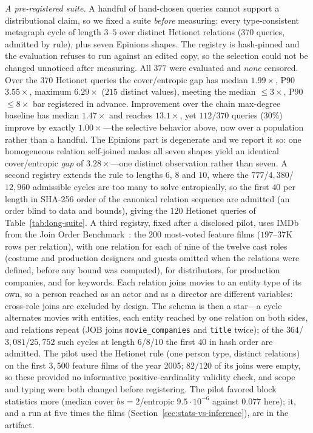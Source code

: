 \documentclass[conference]{IEEEtran}
\begin{document}
\emph{A pre-registered suite.}\label{sec:suite} A handful of hand-chosen queries cannot
support a distributional claim, so we fixed a suite \emph{before}
measuring: every type-consistent metagraph cycle of length $3$--$5$ over
distinct Hetionet relations ($370$ queries, admitted by rule), plus seven
Epinions shapes. The registry is hash-pinned and the evaluation refuses
to run against an edited copy, so the selection could not be changed unnoticed after measuring. All $377$ were evaluated and \emph{none} censored. Over the
$370$ Hetionet queries the cover/entropic gap has median $1.99\times$,
P90 $3.55\times$, maximum $6.29\times$ ($215$ distinct values), meeting
the median ${\le}3\times$, P90 ${\le}8\times$ bar registered in advance.
Improvement over the chain max-degree baseline has median $1.47\times$ and reaches
$13.1\times$, yet $112/370$ queries ($30\%$) improve by exactly
$1.00\times$---the selective behavior above, now over a population
rather than a handful. The Epinions part is degenerate and we report it
so: one homogeneous relation self-joined makes all seven shapes yield an
identical cover/entropic \emph{gap} of $3.28\times$---one distinct
observation rather than seven. A second registry extends the rule to
lengths $6$, $8$ and $10$, where the $777$/$4{,}380$/$12{,}960$ admissible
cycles are too many to solve entropically, so the first $40$ per length in
SHA-256 order of the canonical relation sequence are admitted (an order
blind to data and bounds), giving the $120$ Hetionet queries of
Table~\ref{tab:long-suite}. A third registry, fixed after a disclosed
pilot, uses IMDb from the Join Order Benchmark~\cite{leis2015goodare}:
the $200$ most-voted feature films ($197$--$37$K rows per relation), with
one relation for each of nine of the twelve cast roles (costume and
production designers and guests omitted when the relations were defined,
before any bound was computed), for distributors, for
production companies, and for keywords. Each relation joins movies to an
entity type of its own, so a person reached as an actor and as a director
are different variables: cross-role joins are excluded by design. The
schema is then a star---a cycle alternates movies with entities, each
entity reached by one relation on both sides, and relations repeat (JOB
joins \texttt{movie\_companies} and \texttt{title} twice); of the
$364$/$3{,}081$/$25{,}752$ such cycles at length $6$/$8$/$10$ the first
$40$ in hash order are admitted. The pilot used the Hetionet rule (one
person type, distinct relations) on the first $3{,}500$ feature films of
the year 2005; $82/120$ of its joins were empty, so these provided no informative positive-cardinality validity check, and scope and typing were both changed before registering. The
pilot favored block statistics more (median cover $bs{=}2$/entropic
$9.5{\cdot}10^{-6}$ against $0.077$ here); it, and a run at five times
the films (Section~\ref{sec:stats-vs-inference}), are in the artifact.
\end{document}

